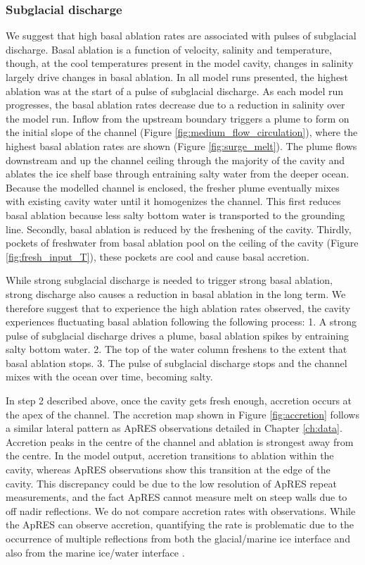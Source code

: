 \subsubsection{Subglacial discharge} \label{sec:ocean_pulse}
We suggest that high basal ablation rates are associated with pulses of subglacial discharge.  Basal ablation is a function of velocity, salinity and temperature, though, at the cool temperatures present in the model cavity, changes in salinity largely drive changes in basal ablation.  
In all model runs presented, the highest ablation was at the start of a pulse of subglacial discharge. As each model run progresses, the basal ablation rates decrease due to a reduction in salinity over the model run. 
Inflow from the upstream boundary triggers a plume to form on the initial slope of the channel (Figure \ref{fig:medium_flow_circulation}), where the highest basal ablation rates are shown (Figure \ref{fig:surge_melt}). The plume flows downstream and up the channel ceiling through the majority of the cavity and ablates the ice shelf base through entraining salty water from the deeper ocean. Because the modelled channel is enclosed, the fresher plume eventually mixes with existing cavity water until it homogenizes the channel. This first reduces basal ablation because less salty bottom water is transported to the grounding line. Secondly, basal ablation is reduced by the freshening of the cavity.  Thirdly, pockets of freshwater from basal ablation pool on the ceiling of the cavity (Figure \ref{fig:fresh_input_T}), these pockets are cool and cause basal accretion.

While strong subglacial discharge is needed to trigger strong basal ablation, strong discharge also causes a reduction in basal ablation in the long term. We therefore suggest that to experience the high ablation rates observed, the cavity experiences fluctuating basal ablation following the following process: 1. A strong pulse of subglacial discharge drives a plume, basal ablation spikes by entraining salty bottom water. 2. The top of the water column freshens to the extent that basal ablation stops.  3. The pulse of subglacial discharge stops and the channel mixes with the ocean over time, becoming salty.

In step 2 described above, once the cavity gets fresh enough, accretion occurs at the apex of the channel. The accretion map shown in Figure \ref{fig:accretion} follows a similar lateral pattern as ApRES observations detailed in Chapter \ref{ch:data}. 
Accretion peaks in the centre of the channel and ablation is strongest away from the centre. In the model output, accretion transitions to ablation within the cavity, whereas ApRES observations show this transition at the edge of the cavity.
This discrepancy could be due to the low resolution of ApRES repeat measurements, and the fact ApRES cannot measure melt on steep walls due to off nadir reflections. We do not compare accretion rates with observations. While the ApRES can observe accretion, quantifying the rate is problematic due to the occurrence of multiple reflections from both the glacial/marine ice interface and also from the marine ice/water interface \citep{craig_personal_comm}.


